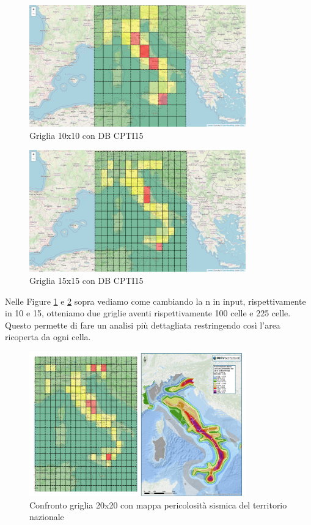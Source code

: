 \begin{figure}[H]
   \centering
   \includegraphics[width=0.835\textwidth]{images/10x10_CPTI15.jpg}
   \caption{Griglia 10x10 con DB CPTI15}
   \label{fig:10x10CPTI15}
\end{figure}

\begin{figure}[H]
   \centering
   \includegraphics[width=0.835\textwidth]{images/15x15_CPTI15.jpg}
   \caption{Griglia 15x15 con DB CPTI15}
   \label{fig:15x15CPTI15}
\end{figure}

Nelle Figure \ref{fig:10x10CPTI15} e \ref{fig:15x15CPTI15} sopra vediamo come cambiando la n in input, rispettivamente in 10 e 15, otteniamo due griglie aventi rispettivamente 100 celle e 225 celle. Questo permette di fare un analisi pi\`u dettagliata restringendo cos\`i l'area ricoperta da ogni cella.

\begin{figure}[H]
   \centering
   \includegraphics[width=0.835\textwidth]{images/mappaPericolositaVs20x20.jpg}
   \caption{Confronto griglia 20x20 con mappa pericolosit\`a sismica del territorio nazionale}
   \label{fig:20x20vsWarningMap}
\end{figure}

